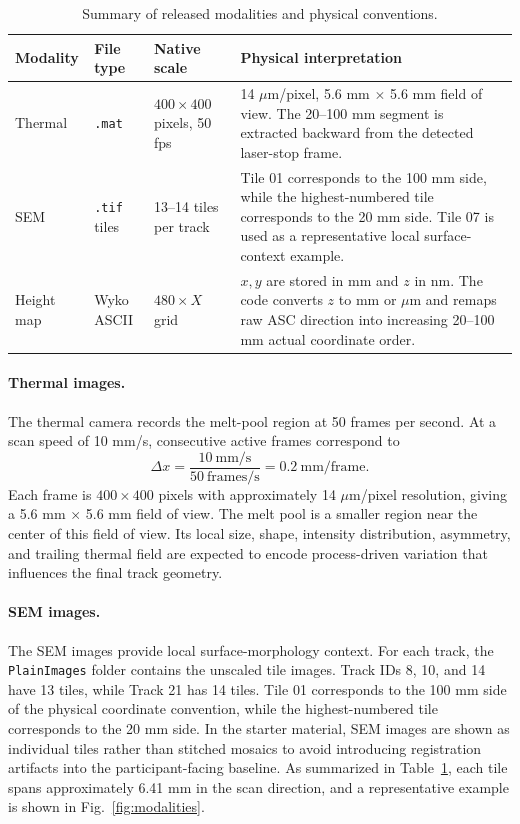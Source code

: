 \documentclass[10pt]{article}
\begin{document}
\begin{table}[t]
\centering
\caption{Summary of released modalities and physical conventions.}
\small
\begin{tabularx}{\linewidth}{l l l X}
\toprule
Modality & File type & Native scale & Physical interpretation \\
\midrule
Thermal & \texttt{.mat} & $400\times400$ pixels, 50 fps & 14 $\mu$m/pixel, 5.6 mm $\times$ 5.6 mm field of view. The 20--100 mm segment is extracted backward from the detected laser-stop frame. \\
SEM & \texttt{.tif} tiles & 13--14 tiles per track & Tile 01 corresponds to the 100 mm side, while the highest-numbered tile corresponds to the 20 mm side. Tile 07 is used as a representative local surface-context example. \\
Height map & Wyko ASCII & $480\times X$ grid & $x,y$ are stored in mm and $z$ in nm. The code converts $z$ to mm or $\mu$m and remaps raw ASC direction into increasing 20--100 mm actual coordinate order. \\
\bottomrule
\end{tabularx}
\label{tab:modalities}
\end{table}

\paragraph{Thermal images.}
The thermal camera records the melt-pool region at 50 frames per second. At a scan speed of 10 mm/s, consecutive active frames correspond to
\begin{equation}
\Delta x = \frac{10~\mathrm{mm/s}}{50~\mathrm{frames/s}} = 0.2~\mathrm{mm/frame}.
\end{equation}
Each frame is $400\times400$ pixels with approximately 14 $\mu$m/pixel resolution, giving a 5.6 mm $\times$ 5.6 mm field of view. The melt pool is a smaller region near the center of this field of view. Its local size, shape, intensity distribution, asymmetry, and trailing thermal field are expected to encode process-driven variation that influences the final track geometry.

\paragraph{SEM images.}
The SEM images provide local surface-morphology context. For each track, the \texttt{PlainImages} folder contains the unscaled tile images. Track IDs 8, 10, and 14 have 13 tiles, while Track 21 has 14 tiles. Tile 01 corresponds to the 100 mm side of the physical coordinate convention, while the highest-numbered tile corresponds to the 20 mm side. In the starter material, SEM images are shown as individual tiles rather than stitched mosaics to avoid introducing registration artifacts into the participant-facing baseline. As summarized in Table~\ref{tab:modalities}, each tile spans approximately 6.41 mm in the scan direction, and a representative example is shown in Fig.~\ref{fig:modalities}.
\end{document}
